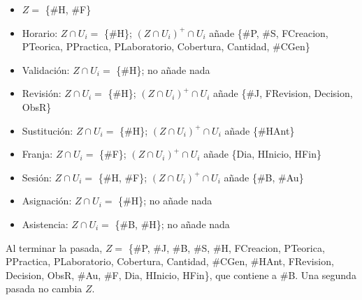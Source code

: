 \begin{itemize}
  \item $Z =$ \{\#H, \#F\}
  \item Horario: $Z \cap U_i =$ \{\#H\}; $(Z \cap U_i)^+ \cap U_i$ añade \{\#P, \#S, FCreacion, PTeorica, PPractica, PLaboratorio, Cobertura, Cantidad, \#CGen\}
  \item Validación: $Z \cap U_i =$ \{\#H\}; no añade nada
  \item Revisión: $Z \cap U_i =$ \{\#H\}; $(Z \cap U_i)^+ \cap U_i$ añade \{\#J, FRevision, Decision, ObsR\}
  \item Sustitución: $Z \cap U_i =$ \{\#H\}; $(Z \cap U_i)^+ \cap U_i$ añade \{\#HAnt\}
  \item Franja: $Z \cap U_i =$ \{\#F\}; $(Z \cap U_i)^+ \cap U_i$ añade \{Dia, HInicio, HFin\}
  \item Sesión: $Z \cap U_i =$ \{\#H, \#F\}; $(Z \cap U_i)^+ \cap U_i$ añade \{\#B, \#Au\}
  \item Asignación: $Z \cap U_i =$ \{\#H\}; no añade nada
  \item Asistencia: $Z \cap U_i =$ \{\#B, \#H\}; no añade nada
\end{itemize}
Al terminar la pasada, $Z =$ \{\#P, \#J, \#B, \#S, \#H, FCreacion, PTeorica, PPractica, PLaboratorio, Cobertura, Cantidad, \#CGen, \#HAnt, FRevision, Decision, ObsR, \#Au, \#F, Dia, HInicio, HFin\}, que contiene a \#B. Una segunda pasada no cambia $Z$.
